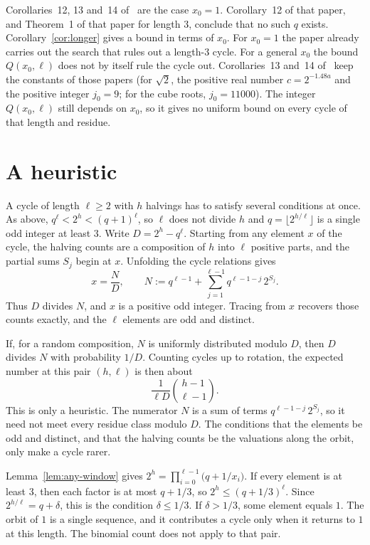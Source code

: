 \documentclass[11pt]{article}
\begin{document}
Corollaries~12, 13 and~14 of~\cite{hackman-i} are the case $x_0 = 1$.
Corollary~12 of that paper, and Theorem~1 of that paper for length $3$, conclude that no such $q$ exists.
Corollary~\ref{cor:longer} gives a bound in terms of $x_0$.
For $x_0 = 1$ the paper already carries out the search that rules out a length-$3$ cycle.
For a general $x_0$ the bound $Q(x_0, \ell)$ does not by itself rule the cycle out.
Corollaries~13 and~14 of~\cite{hackman-i} keep the constants of those papers (for $\sqrt{2}$, the positive real number $c = 2^{-1.48 a}$ and the positive integer $j_0 = 9$; for the cube roots, $j_0 = 11000$).
The integer $Q(x_0, \ell)$ still depends on $x_0$, so it gives no uniform bound on every cycle of that length and residue.

\section{A heuristic}
\label{sec:all-cycles}

A cycle of length $\ell \ge 2$ with $h$ halvings has to satisfy several conditions at once.
As above, $q^\ell < 2^h < (q+1)^\ell$, so $\ell$ does not divide $h$ and $q = \lfloor 2^{h/\ell}\rfloor$ is a single odd integer at least $3$.
Write $D = 2^h - q^\ell$.
Starting from any element $x$ of the cycle, the halving counts are a composition of $h$ into $\ell$ positive parts, and the partial sums $S_j$ begin at $x$.
Unfolding the cycle relations gives
\[
x = \frac{N}{D}, \qquad N := q^{\ell-1} + \sum_{j=1}^{\ell-1} q^{\ell-1-j}\, 2^{S_j}.
\]
Thus $D$ divides $N$, and $x$ is a positive odd integer.
Tracing from $x$ recovers those counts exactly, and the $\ell$ elements are odd and distinct.

If, for a random composition, $N$ is uniformly distributed modulo $D$, then $D$ divides $N$ with probability $1/D$.
Counting cycles up to rotation, the expected number at this pair $(h,\ell)$ is then about
\[
\frac{1}{\ell D}\binom{h-1}{\ell-1}.
\]
This is only a heuristic.
The numerator $N$ is a sum of terms $q^{\ell-1-j}\, 2^{S_j}$, so it need not meet every residue class modulo $D$.
The conditions that the elements be odd and distinct, and that the halving counts be the valuations along the orbit, only make a cycle rarer.

Lemma~\ref{lem:any-window} gives $2^h = \prod_{i=0}^{\ell-1}\bigl(q + 1/x_i\bigr)$.
If every element is at least $3$, then each factor is at most $q + 1/3$, so $2^h \le (q + 1/3)^\ell$.
Since $2^{h/\ell} = q + \delta$, this is the condition $\delta \le 1/3$.
If $\delta > 1/3$, some element equals $1$.
The orbit of $1$ is a single sequence, and it contributes a cycle only when it returns to $1$ at this length.
The binomial count does not apply to that pair.
\end{document}
